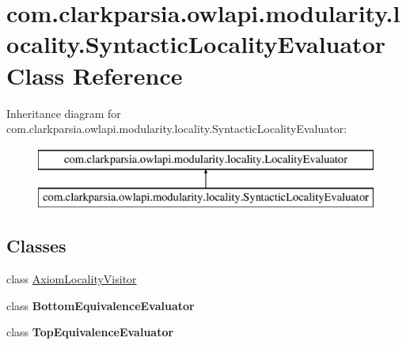 \hypertarget{classcom_1_1clarkparsia_1_1owlapi_1_1modularity_1_1locality_1_1_syntactic_locality_evaluator}{\section{com.\-clarkparsia.\-owlapi.\-modularity.\-locality.\-Syntactic\-Locality\-Evaluator Class Reference}
\label{classcom_1_1clarkparsia_1_1owlapi_1_1modularity_1_1locality_1_1_syntactic_locality_evaluator}
}
Inheritance diagram for com.\-clarkparsia.\-owlapi.\-modularity.\-locality.\-Syntactic\-Locality\-Evaluator\-:\begin{figure}[H]
\begin{center}
\leavevmode
\includegraphics[height=2.000000cm]{classcom_1_1clarkparsia_1_1owlapi_1_1modularity_1_1locality_1_1_syntactic_locality_evaluator}
\end{center}
\end{figure}
\subsection*{Classes}
\begin{DoxyCompactItemize}
\item 
class \hyperlink{classcom_1_1clarkparsia_1_1owlapi_1_1modularity_1_1locality_1_1_syntactic_locality_evaluator_1_1_axiom_locality_visitor}{Axiom\-Locality\-Visitor}
\item 
class {\bfseries Bottom\-Equivalence\-Evaluator}
\item 
class {\bfseries Top\-Equivalence\-Evaluator}
\end{DoxyCompactItemize}
